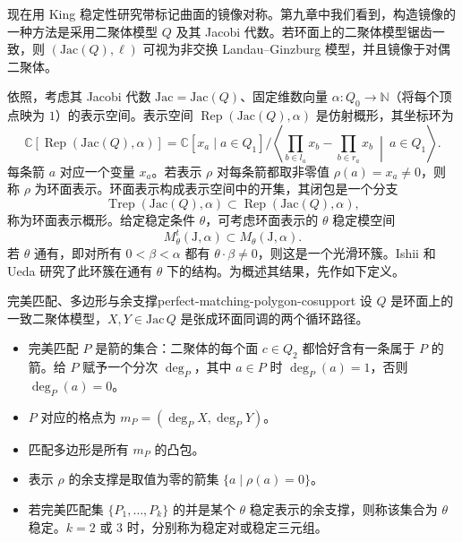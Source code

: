 现在用 King 稳定性研究带标记曲面的镜像对称。第九章中我们看到，构造镜像的一种方法是采用二聚体模型 $Q$ 及其 Jacobi 代数。若环面上的二聚体模型锯齿一致，则 $(\mathrm{Jac}(Q),\ell)$ 可视为非交换 Landau--Ginzburg 模型，并且镜像于对偶二聚体。

依照，考虑其 Jacobi 代数 $\mathrm{Jac}=\mathrm{Jac}(Q)$、固定维数向量 $\alpha\colon Q_0\to\mathbb N$（将每个顶点映为 $1$）的表示空间。表示空间 $\operatorname{Rep}(\mathrm{Jac}(Q),\alpha)$ 是仿射概形，其坐标环为
\[
  \mathbb C[\operatorname{Rep}(\mathrm{Jac}(Q),\alpha)]
  =\mathbb C[x_a\mid a\in Q_1]
  \Big/\left\langle\prod_{b\in l_a}x_b-\prod_{b\in r_a}x_b\ \middle|\ a\in Q_1\right\rangle.
\]
每条箭 $a$ 对应一个变量 $x_a$。若表示 $\rho$ 对每条箭都取非零值 $\rho(a)=x_a\ne0$，则称 $\rho$ 为环面表示。环面表示构成表示空间中的开集，其闭包是一个分支
\[
  \operatorname{Trep}(\mathrm{Jac}(Q),\alpha)\subset\operatorname{Rep}(\mathrm{Jac}(Q),\alpha),
\]
称为环面表示概形。给定稳定条件 $\theta$，可考虑环面表示的 $\theta$ 稳定模空间
\[
  M^t_\theta(\mathrm J,\alpha)\subset M_\theta(\mathrm J,\alpha).
\]
若 $\theta$ 通有，即对所有 $0<\beta<\alpha$ 都有 $\theta\cdot\beta\ne0$，则这是一个光滑环簇。Ishii 和 Ueda 研究了此环簇在通有 $\theta$ 下的结构。为概述其结果，先作如下定义。

\begin{definition}{完美匹配、多边形与余支撑}{perfect-matching-polygon-cosupport}
设 $Q$ 是环面上的一致二聚体模型，$X,Y\in\mathrm{Jac}\,Q$ 是张成环面同调的两个循环路径。
\begin{itemize}
  \item 完美匹配 $P$ 是箭的集合：二聚体的每个面 $c\in Q_2$ 都恰好含有一条属于 $P$ 的箭。给 $P$ 赋予一个分次 $\deg_P$，其中 $a\in P$ 时 $\deg_P(a)=1$，否则 $\deg_P(a)=0$。
  \item $P$ 对应的格点为 $m_P=(\deg_P X,\deg_P Y)$。
  \item 匹配多边形是所有 $m_P$ 的凸包。
  \item 表示 $\rho$ 的余支撑是取值为零的箭集 $\{a\mid\rho(a)=0\}$。
  \item 若完美匹配集 $\{P_1,\ldots,P_k\}$ 的并是某个 $\theta$ 稳定表示的余支撑，则称该集合为 $\theta$ 稳定。$k=2$ 或 $3$ 时，分别称为稳定对或稳定三元组。
\end{itemize}
\end{definition}

